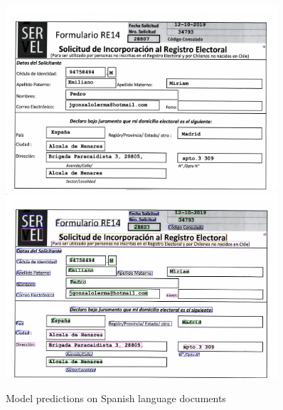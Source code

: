 \begin{figure}[!ht]
\centering
\includegraphics[width=0.9\textwidth]{chapters/images/experiments_and_results/original/es_train_15.jpg}\hfill
\includegraphics[width=0.9\textwidth]{chapters/images/experiments_and_results/results/es_train_15.jpg}
% 
\caption{Model predictions on Spanish language documents}
    \label{fig:result_lang_es}
\end{figure}

